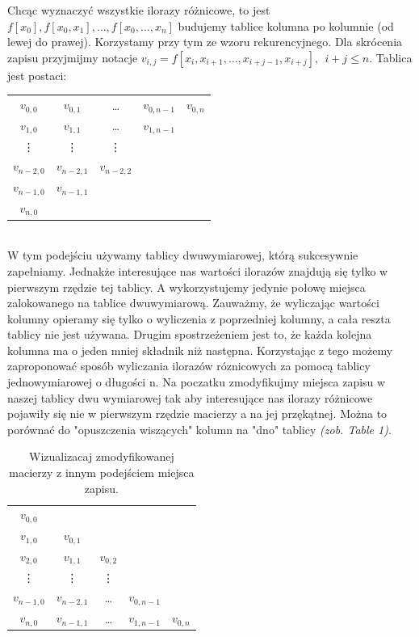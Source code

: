 \documentclass[]{article}
\begin{document}
Chcąc wyznaczyć wszystkie ilorazy różnicowe, to jest $f[x_0], f[x_0, x_1], \ldots, f[x_0, \ldots, x_n]$ budujemy tablice kolumna po kolumnie (od lewej do prawej). Korzystamy przy tym ze wzoru rekurencyjnego. Dla skrócenia zapisu przyjmijmy notacje $v_{i,j} = f[x_i, x_{i+1}, \ldots, x_{i+j-1}, x_{i+j}],\:\: i + j \le n$. Tablica jest postaci:
\begin{table}[h]
	\centering
	\begin{tabular}{c c c c c} 
		\hline
		 \rowcolor{blue!20}$v_{0,0}$ & $v_{0,1}$ & \ldots & $v_{0,n - 1}$ & $v_{0,n}$\\
		 $v_{1,0}$ & $v_{1,1}$ & \ldots & $v_{1,n - 1}$ &\\
		 \vdots & \vdots & \vdots  &   & \\
		 $v_{n - 2,0}$ & $v_{n - 2,1}$ & $v_{n - 2,2}$ & &\\
		 $v_{n - 1,0}$ & $v_{n - 1,1}$ & & &\\
		 $v_{n,0}$ & & & &\\
		
		\hline
	\end{tabular}
\end{table} 
\\
W tym podejściu używamy tablicy dwuwymiarowej, którą sukcesywnie zapełniamy. Jednakże interesujące nas wartości ilorazów znajdują się tylko w pierwszym rzędzie tej tablicy. A wykorzystujemy jedynie połowę miejsca zalokowanego na tablice dwuwymiarową. Zauważmy, że wyliczając wartości kolumny opieramy się tylko o wyliczenia z poprzedniej kolumny, a cała reszta tablicy nie jest używana. Drugim spostrzeżeniem jest to, że każda kolejna kolumna ma o jeden mniej składnik niż następna. Korzystając z tego możemy zaproponować sposób wyliczania ilorazów róznicowych za pomocą tablicy jednowymiarowej o długości n. 
Na poczatku zmodyfikujmy miejsca zapisu w naszej tablicy dwu wymiarowej tak aby interesujące nas ilorazy różnicowe pojawiły się nie w pierwszym rzędzie macierzy a na jej przękątnej. Można to porównać do "opuszczenia wiszących" kolumn na "dno" tablicy \textit{(zob. Table 1)}. 


\begin{table}[h]
	\centering
	\begin{tabular}{c c c c c} 
		\hline
		\cellcolor{blue!20}$v_{0,0}$ & & & &\\
		$v_{1,0}$ & \cellcolor{blue!20}$v_{0,1}$ & & &\\
		$v_{2,0}$ & $v_{1,1}$ & \cellcolor{blue!20}$v_{0,2}$& &\\
		\vdots & \vdots & \vdots  &  & \\
		$v_{n - 1,0}$ & $v_{n - 2,1}$ & \ldots & \cellcolor{blue!20}$v_{0,n - 1}$&\\
		$v_{n,0}$ & $v_{n - 1,1}$ & \ldots & $v_{1,n - 1}$ & \cellcolor{blue!20}$v_{0,n}$\\
		
		\hline
	\end{tabular}
	\caption{Wizualizacaj zmodyfikowanej macierzy z innym podejściem miejsca zapisu.}
\end{table}
\end{document}
